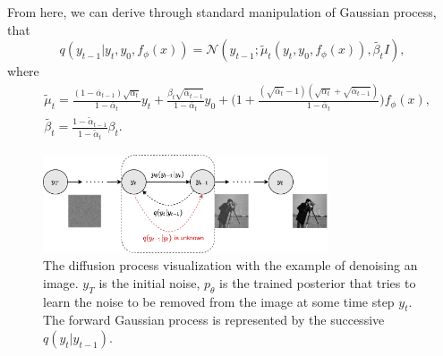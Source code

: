 \documentclass{article}
\begin{document}


From here, we can derive through standard manipulation of Gaussian process, that 
\begin{equation}
  q(y_{t-1}|y_t,y_0,f_\phi(x)) = \mathcal{N}(y_{t-1}; \tilde{\mu}_t(y_t, y_0, f_\phi(x)), \tilde{\beta_t}I),
\end{equation}
where 
\begin{align*}
  &\tilde{\mu}_t = \frac{(1-\bar{\alpha}_{t-1})\sqrt{\alpha_t}}{1-\bar{\alpha}_t}y_t + \frac{\beta_t\sqrt{\bar{\alpha}_{t-1}}}{1-\bar{\alpha}_t}y_0 + \biggl(1 + \frac{(\sqrt{\bar{\alpha}_t}-1)(\sqrt{\alpha_t}+\sqrt{\bar{\alpha}_{t-1}})}{1-\bar{\alpha}_t}\biggl)f_\phi(x), \\
  &\tilde{\beta_t} = \frac{1-\tilde{\alpha}_{t-1}}{1-\tilde{\alpha}_{t}}\beta_t.
\end{align*}

\begin{figure}[ht]
  \centering
  \includegraphics[width=0.75\textwidth]{diffusion.png}
  \caption{The diffusion process visualization with the example of denoising an image. $y_T$ is the initial noise, $p_\theta$ is the trained posterior that tries to learn the noise to be removed from the image at some time step $y_t$. The forward Gaussian process is represented by the successive $q(y_t|y_{t-1})$.}
  \label{fig:diffusion}
\end{figure}
\end{document}
